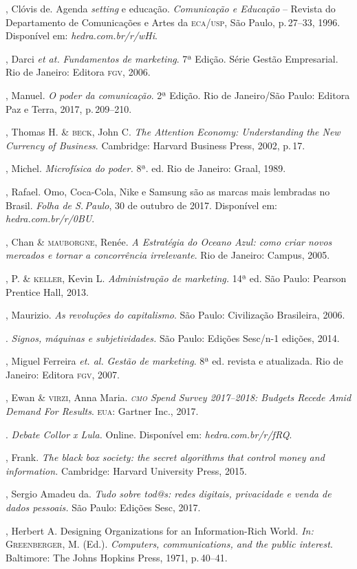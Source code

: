 \begin{bibliohedra}

, Clóvis de. Agenda \textit{setting} e educação.
\textit{Comunicação e Educação} -- Revista do Departamento de Comunicações e
Artes da \textsc{eca}/\textsc{usp}, São Paulo, p.\,27--33, 1996. Disponível em: \textit{hedra.com.br/r/wHi}.

, Darci \textit{et at.} \textit{Fundamentos de marketing}. 7ª Edição. Série Gestão Empresarial. Rio de Janeiro: Editora \textsc{fgv}, 2006.

, Manuel. \textit{O poder da comunicação}. 2ª
Edição. Rio de Janeiro/São Paulo: Editora Paz e Terra, 2017, p.\,209--210.

, Thomas H. \& \textsc{beck}, John C. \textit{The Attention Economy:
Understanding the New Currency of Business}. Cambridge: Harvard Business
Press, 2002, p.\,17.

, Michel. \textit{Microfísica do poder.} 8ª. ed. Rio de
Janeiro: Graal, 1989.

, Rafael. Omo, Coca-Cola, Nike e Samsung são as marcas
mais lembradas no Brasil. \textit{Folha de S.\,Paulo}, 30 de outubro de 2017.
Disponível em: \textit{hedra.com.br/r/0BU}.

, Chan \& \textsc{mauborgne}, Renée. \textit{A Estratégia do Oceano Azul:
como criar novos mercados e tornar a concorrência irrelevante}. Rio de
Janeiro: Campus, 2005.

, P. \& \textsc{keller}, Kevin L. \textit{Administração de marketing.} 14ª
ed. São Paulo: Pearson Prentice Hall, 2013.

, Maurizio. \textit{As revoluções do capitalismo}. São Paulo: Civilização
Brasileira, 2006.

\titidem. \textit{Signos, máquinas e subjetividades.} São
Paulo: Edições Sesc/n-1 edições, 2014.

, Miguel Ferreira \textit{et. al.} \textit{Gestão de marketing}. 8ª ed. revista e atualizada. Rio de Janeiro: Editora \textsc{fgv}, 2007.

, Ewan \& \textsc{virzi}, Anna Maria. \textit{\textsc{cmo} Spend Survey 2017--2018: Budgets Recede Amid Demand For Results}. \textsc{eua}: Gartner Inc., 2017.

. \textit{Debate Collor x Lula.} Online. Disponível em: \textit{hedra.com.br/r/fRQ}.

, Frank. \textit{The black box society: the secret algorithms
that control money and information.} Cambridge: Harvard University Press, 2015.

, Sergio Amadeu da. \textit{Tudo sobre tod@s: redes digitais,
privacidade e venda de dados pessoais.} São Paulo: Edições Sesc, 2017.

, Herbert A. Designing Organizations for an
Information-Rich World. \textit{In:} \textsc{Greenberger}, M. (Ed.). \textit{Computers,
communications, and the public interest}. Baltimore: The Johns Hopkins Press, 1971,
p.\,40--41.

\end{bibliohedra}


